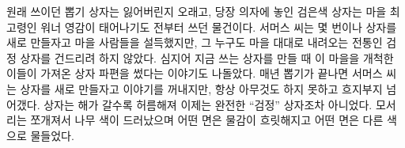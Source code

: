 \documentclass{translation}
\begin{document}
원래 쓰이던 뽑기 상자는 잃어버린지 오래고, 당장 의자에 놓인 검은색 상자는 마을 최고령인 워너 영감이 태어나기도 전부터 쓰던 물건이다.
서머스 씨는 몇 번이나 상자를 새로 만들자고 마을 사람들을 설득했지만, 그 누구도 마을 대대로 내려오는 전통인 검정 상자를 건드리려 하지 않았다.
심지어 지금 쓰는 상자를 만들 때 이 마을을 개척한 이들이 가져온 상자 파편을 썼다는 이야기도 나돌았다.
매년 뽑기가 끝나면 서머스 씨는 상자를 새로 만들자고 이야기를 꺼내지만, 항상 아무것도 하지 못하고 흐지부지 넘어갰다.
상자는 해가 갈수록 허름해져 이제는 완전한 ``검정'' 상자조차 아니었다.
모서리는 쪼개져서 나무 색이 드러났으며 어떤 면은 물감이 흐릿해지고 어떤 면은 다른 색으로 물들었다.
\end{document}
